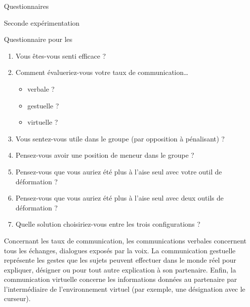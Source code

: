 \documentclass[myfrancais]{mythesis}
\begin{document}
\begin{mychapter}{Questionnaires}
\begin{mysection}{Seconde expérimentation}
\begin{mysubsection}{Questionnaire pour les }
				\begin{enumerate}
					\item Vous êtes-vous senti efficace ?
					\item Comment évalueriez-vous votre taux de communication\dots{}
						\begin{itemize}
							\item verbale ?
							\item gestuelle ?
							\item virtuelle ?
						\end{itemize}
					\item Vous sentez-vous utile dans le groupe (par opposition à pénalisant) ?
					\item Pensez-vous avoir une position de meneur dans le groupe ?
					\item Pensez-vous que vous auriez été plus à l'aise seul avec votre outil de déformation ?
					\item Pensez-vous que vous auriez été plus à l'aise seul avec deux outils de déformation ?
					\item Quelle solution choisiriez-vous entre les trois configurations ?
				\end{enumerate}

				Concernant les taux de communication, les communications verbales concernent tous les échanges, dialogues exposés par la voix.
				La communication gestuelle représente les gestes que les sujets peuvent effectuer dans le monde réel pour expliquer, désigner ou pour tout autre explication à son partenaire.
				Enfin, la communication virtuelle concerne les informations données au partenaire par l'intermédiaire de l'environnement virtuel (par exemple, une désignation avec le curseur).
			\end{mysubsection}
		\end{mysection}
	\end{mychapter}
\end{document}
